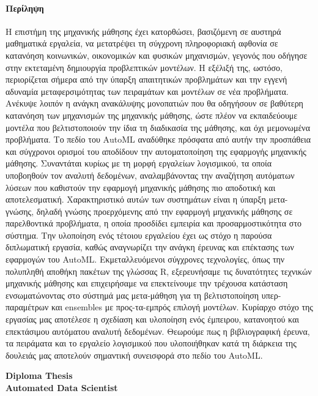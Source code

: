 {
	\titleformat{\paragraph}[display]{\normalfont\Large\bfseries\centering}{\theparagraph}{1em}{}
	\paragraph{Περίληψη}
	Η επιστήμη της μηχανικής μάθησης έχει κατορθώσει, βασιζόμενη σε αυστηρά μαθηματικά εργαλεία, να μετατρέψει τη σύγχρονη πληροφοριακή αφθονία σε κατανόηση κοινωνικών, οικονομικών και φυσικών μηχανισμών, γεγονός που οδήγησε στην εκτεταμένη δημιουργία προβλεπτικών μοντέλων. Η εξέλιξή της, ωστόσο, περιορίζεται σήμερα από την ύπαρξη απαιτητικών προβλημάτων και την εγγενή αδυναμία μεταφερσιμότητας των πειραμάτων και μοντέλων σε νέα προβλήματα. Ανέκυψε λοιπόν η ανάγκη ανακάλυψης μονοπατιών που θα οδηγήσουν σε βαθύτερη κατανόηση των μηχανισμών της μηχανικής μάθησης, ώστε πλέον να εκπαιδεύουμε μοντέλα που βελτιστοποιούν την ίδια τη διαδικασία της μάθησης, και όχι μεμονωμένα προβλήματα. Το πεδίο του ΑutoML αναδύθηκε πρόσφατα από αυτήν την προσπάθεια και σύγχρονοι ορισμοί του αποδίδουν την αυτοματοποίηση της εφαρμογής μηχανικής μάθησης. Συναντάται κυρίως με τη μορφή εργαλείων λογισμικού, τα οποία υποβοηθούν τον αναλυτή δεδομένων, αναλαμβάνοντας την αναζήτηση αυτόματων λύσεων που καθιστούν την εφαρμογή μηχανικής μάθησης πιο αποδοτική και αποτελεσματική. Χαρακτηριστικό αυτών των συστημάτων είναι η ύπαρξη μετα-γνώσης, δηλαδή γνώσης προερχόμενης από την εφαρμογή μηχανικής μάθησης σε παρελθοντικά προβλήματα, η οποία προσδίδει εμπειρία και προσαρμοστικότητα στο σύστημα. Την υλοποίηση ενός τέτοιου εργαλείου έχει ως στόχο η παρούσα διπλωματική εργασία, καθώς αναγνωρίζει την ανάγκη έρευνας και επέκτασης των εφαρμογών του \gls{AutoML}. Εκμεταλλευόμενοι σύγχρονες τεχνολογίες, όπως την πολυπληθή αποθήκη πακέτων της γλώσσας R, εξερευνήσαμε τις δυνατότητες τεχνικών μηχανικής μάθησης και επιχειρήσαμε να επεκτείνουμε την τρέχουσα κατάσταση ενσωματώνοντας στο σύστημά μας μετα-μάθηση για τη βελτιστοποίηση υπερ-παραμέτρων και ensembles με προς-τα-εμπρός επιλογή μοντέλων. Κυρίαρχο στόχο της εργασίας μας αποτέλεσε η σχεδίαση και υλοποίηση ενός έμπειρου, κατανοητού και επεκτάσιμου αυτόματου αναλυτή δεδομένων. Θεωρούμε πως η βιβλιογραφική έρευνα, τα πειράματα και το εργαλείο λογισμικού που υλοποιήθηκαν κατά τη διάρκεια της δουλειάς μας αποτελούν σημαντική συνεισφορά στο πεδίο του \gls{AutoML}. 
	\newpage
	\begin{center}
		\textbf{\huge{Diploma Thesis\\}}
		\vspace{0.5cm}
		\textbf{\Large{Automated Data Scientist}}
	\end{center}
	
}
